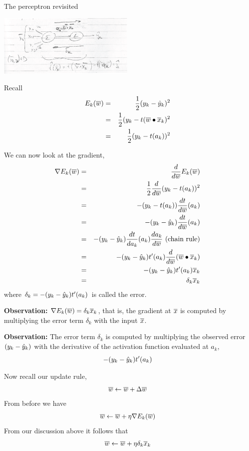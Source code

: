 \documentclass[a4paper,blends,pdf,colorBG,slideColor]{prosper}
\begin{document}
The perceptron revisited
\begin{center}
\includegraphics[height=30mm]{images/perceptron-revisited.eps}
\end{center}
Recall
\begin{eqnarray*}
E_k(\overline{w}) &=& \frac{1}{2}(y_k - \hat{y}_k)^2\\
	&=& \frac{1}{2}(y_k-t(\overline{w}\bullet\overline{x}_k)^2\\
	&=& \frac{1}{2}(y_k-t(a_k))^2
\end{eqnarray*}
\es

We can now look at the gradient,
\begin{eqnarray*}
\nabla E_k(\overline{w}) &=& \frac{d}{d\overline{w}} E_k(\overline{w}) \\
	&=& \frac{1}{2} \frac{d}{d\overline{w}}(y_k-t(a_k))^2\\
	&=& -(y_k -t(a_k))\frac{dt}{d\overline{w}}(a_k)\\
	&=& -(y_k -\hat{y}_k)\frac{dt}{d\overline{w}}(a_k)\\
	&=& -(y_k -\hat{y}_k)\frac{dt}{da_k} (a_k) \frac{da_k}{d\overline{w}} \mbox{ (chain rule)}\\
	&=& -(y_k -\hat{y}_k)t'(a_k) \frac{d}{d\overline{w}}(\overline{w}\bullet\overline{x}_k) \\
	&=& -(y_k -\hat{y}_k)t'(a_k) \overline{x}_k \\
	&=& \delta_k \overline{x}_k
\end{eqnarray*}
where $\delta_k = -(y_k -\hat{y}_k)t'(a_k)$ is called the error.
\es

{\bf Observation:} $\nabla E_k(\overline{w}) = \delta_k \overline{x}_k$, that is, the gradient at $\overline{x}$ is computed by multiplying the error term $\delta_k$
with the input $\overline{x}$.

\vspace{.1in}

{\bf Observation:} The error term $\delta_k$ is computed by multiplying the observed error $(y_k - \hat{y}_k)$ with the derivative 
of the activation function evaluated at $a_k$,
\[
-(y_k -\hat{y}_k)t'(a_k)
\]
\es

Now recall our update rule,
\[
\overline{w} \leftarrow \overline{w} + \Delta \overline{w}
\]
From before we have
\[
\overline{w} \leftarrow \overline{w} + \eta \nabla E_k(\overline{w})
\]
From our discussion above it follows that
\[
\overline{w} \leftarrow \overline{w} + \eta \delta_k\overline{x}_k
\]
\end{document}
